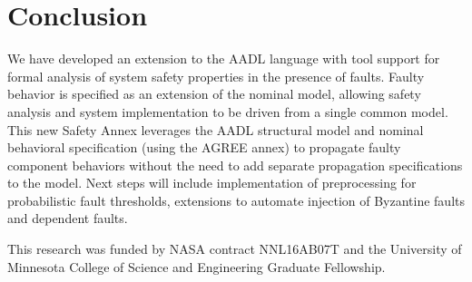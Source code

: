\section{Conclusion}

We have developed an extension to the AADL language with tool support for formal analysis of system safety properties in the presence of faults. Faulty behavior is specified as an extension of the nominal model, allowing safety analysis and system implementation to be driven from a single common model. This new Safety Annex leverages the AADL structural model and nominal behavioral specification (using the AGREE annex) to propagate faulty component behaviors without the need to add separate propagation specifications to the model.   Next steps will include implementation of preprocessing for probabilistic fault thresholds, extensions to automate injection of Byzantine faults and dependent faults.  

 This research was funded by NASA contract NNL16AB07T and the University of Minnesota College of Science and Engineering Graduate Fellowship.


